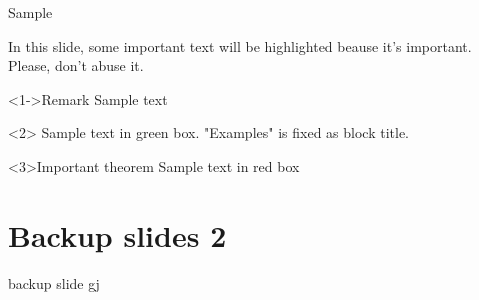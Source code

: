 \begin{frame}[t]{Sample}{}
	
	In this slide, some important text will be
	\alert<2->{highlighted} beause it's important.
	Please, don't abuse it.
	
	\begin{block}<1->{Remark}
	Sample text
	\end{block}
	
	\begin{examples}
	Sample text in green box. "Examples" is fixed as block title.
	\end{examples}
	
	\begin{alertblock}{Important theorem}
	Sample text in red box
	\end{alertblock}
	
\end{frame}

\section{Backup slides 2}

\begin{frame}{backup slide}{}
	gj
	
	\hyperlink{butterfly}{}
	
	\hyperlink{butterfly}{}
	
	\hyperlink{butterfly}{}
	
	\hyperlink{butterfly}{}
\end{frame}

%
 

